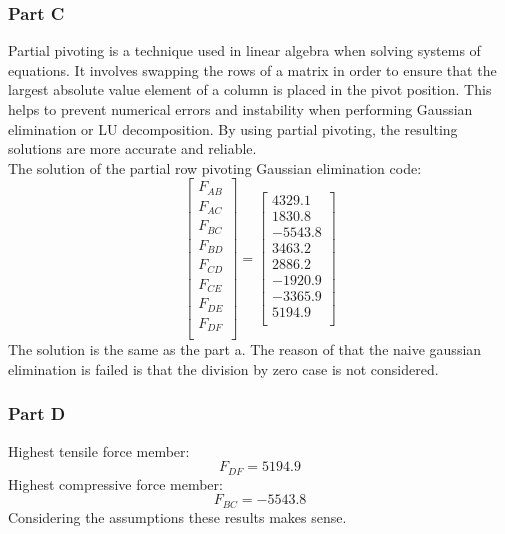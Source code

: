 \documentclass[12pt, a4paper]{article}
\begin{document}
\subsubsection{Part C}

Partial pivoting is a technique used in linear algebra when solving systems of equations. It involves swapping the rows of a matrix in order to ensure that the largest absolute value element of a column is placed in the pivot position. This helps to prevent numerical errors and instability when performing Gaussian elimination or LU decomposition. By using partial pivoting, the resulting solutions are more accurate and reliable.\\
The solution of the partial row pivoting Gaussian elimination code:
\begin{equation}
\begin{bmatrix}
F_{A B} \\
F_{A C} \\
F_{B C} \\
F_{B D} \\
F_{C D} \\
F_{C E} \\
F_{D E} \\
F_{D F} \\
\end{bmatrix}= 
\begin{bmatrix}
4329.1\\
1830.8\\
-5543.8\\
3463.2\\
2886.2\\
-1920.9\\
-3365.9\\
5194.9\\
\end{bmatrix}\end{equation}
The solution is the same as the part a. The reason of that the naive gaussian elimination is failed is that the division by zero case is not considered.
\subsubsection{Part D}
Highest tensile force member:
\begin{equation}F_{D F} = 5194.9\end{equation}
Highest compressive force member:
\begin{equation}F_{B C} = -5543.8\end{equation}
Considering the assumptions these results makes sense.
\end{document}
